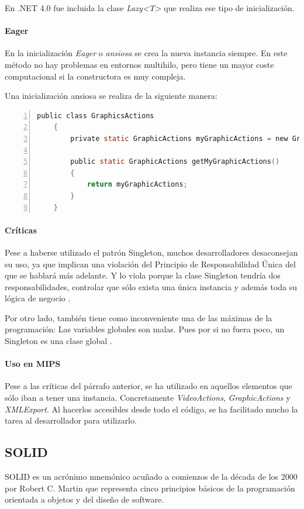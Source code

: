 En .NET 4.0 fue incluida la clase \emph{Lazy<T>} que realiza ese tipo de inicializaci\'on.

\paragraph{Eager} En la inicializaci\'on \emph{Eager} o \emph{ansiosa} se crea la nueva instancia siempre. En este m\'etodo no hay problemas
en entornos multihilo, pero tiene un mayor coste computacional si la constructora es muy compleja.

Una inicializaci\'on ansiosa se realiza de la siguiente manera:
\begin{lstlisting}[language=C, numbers=left, showspaces=false, breaklines=true, tabsize=2]
    public class GraphicsActions 
    {
        private static GraphicActions myGraphicActions = new GraphicActions();
        
        public static GraphicActions getMyGraphicActions()
        { 
            return myGraphicActions;
        }
    }
\end{lstlisting}

\paragraph{Cr\'iticas}Pese a haberse utilizado el patr\'on Singleton, muchos desarrolladores desaconsejan su uso, ya que implican
una violaci\'on del Principio de Responsabilidad \'Unica del que se hablar\'a m\'as adelante. Y lo viola porque
la clase Singleton tendr\'ia dos responsabilidades, controlar que s\'olo exista una \'unica instancia y adem\'as
toda su l\'ogica de negocio \cite{Singleton:EVIL}.

Por otro lado, tambi\'en tiene como inconveniente una de las m\'aximas de la programaci\'on: Las variables globales
son malas. Pues por si no fuera poco, un Singleton es una clase global \cite{Singleton:EVIL}.

\paragraph{Uso en MIPS}
Pese a las cr\'iticas del p\'arrafo anterior, se ha utilizado en aquellos elementos que s\'olo iban a tener
una instancia. Concretamente \emph{VideoActions}, \emph{GraphicActions} y \emph{XMLExport}. Al
hacerlos accesibles desde todo el c\'odigo, se ha facilitado mucho la tarea al desarrollador para utilizarlo.

\subsection{SOLID}
SOLID es un acr\'{o}nimo mnem\'{o}nico acu\~{n}ado a comienzos de la d\'{e}cada de los 2000 por 
Robert C. Martin \cite{SOLID:ADefinition}
que representa cinco principios b\'{a}sicos de la programaci\'{o}n orientada a objetos y del dise\~{n}o de software.

